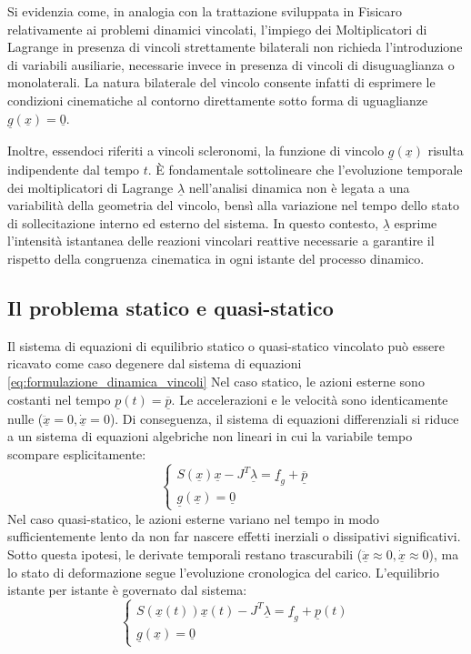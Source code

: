 Si evidenzia come, in analogia con la trattazione sviluppata in Fisicaro \cite{Fisicaro} relativamente ai problemi dinamici vincolati, l'impiego dei Moltiplicatori di Lagrange in presenza di vincoli strettamente bilaterali non richieda l'introduzione di variabili ausiliarie, necessarie invece in presenza di vincoli di disuguaglianza o monolaterali. La natura bilaterale del vincolo consente infatti di esprimere le condizioni cinematiche al contorno direttamente sotto forma di uguaglianze $\underline{g}(\underline{x}) = \underline{0}$.

Inoltre, essendoci riferiti a vincoli scleronomi, la funzione di vincolo $\underline{g}(\underline{x})$ risulta indipendente dal tempo $t$. È fondamentale sottolineare che l'evoluzione temporale dei moltiplicatori di Lagrange $\underline{\lambda}$ nell'analisi dinamica non è legata a una variabilità della geometria del vincolo, bensì alla variazione nel tempo dello stato di sollecitazione interno ed esterno del sistema. In questo contesto, $\underline{\lambda}$ esprime l'intensità istantanea delle reazioni vincolari reattive necessarie a garantire il rispetto della congruenza cinematica in ogni istante del processo dinamico.

\subsection{Il problema statico e quasi-statico}
Il sistema di equazioni di equilibrio statico o quasi-statico vincolato può essere ricavato come caso degenere dal sistema di equazioni \eqref{eq:formulazione_dinamica_vincoli}
Nel caso statico, le azioni esterne sono costanti nel tempo $\underline{p}(t) = \overline{\underline{p}}$. Le accelerazioni e le velocità sono identicamente nulle ($\ddot{\underline{x}} = 0, \dot{\underline{x}} = 0$). Di conseguenza, il sistema di equazioni differenziali si riduce a un sistema di equazioni algebriche non lineari in cui la variabile tempo scompare esplicitamente:
\begin{equation}
   \begin{cases}
      S(\underline{x})\underline{x} - J^T \underline{\lambda} = \underline{f}_g + \overline{\underline{p}} \\
      \underline{g}(\underline{x}) = \underline{0}
   \end{cases}
   \label{eq:problema_statico}
\end{equation}
Nel caso quasi-statico, le azioni esterne variano nel tempo in modo sufficientemente lento da non far nascere effetti inerziali o dissipativi significativi. Sotto questa ipotesi, le derivate temporali restano trascurabili ($\ddot{\underline{x}} \approx 0, \dot{\underline{x}} \approx 0$), ma lo stato di deformazione segue l'evoluzione cronologica del carico. L'equilibrio istante per istante è governato dal sistema: 
\begin{equation}
   \begin{cases}
      S(\underline{x}(t))\underline{x}(t) - J^T \underline{\lambda} = \underline{f}_g + \underline{p}(t) \\
      \underline{g}(\underline{x}) = \underline{0}
   \end{cases}
   \label{eq:problema_quasi_statico}
\end{equation}

